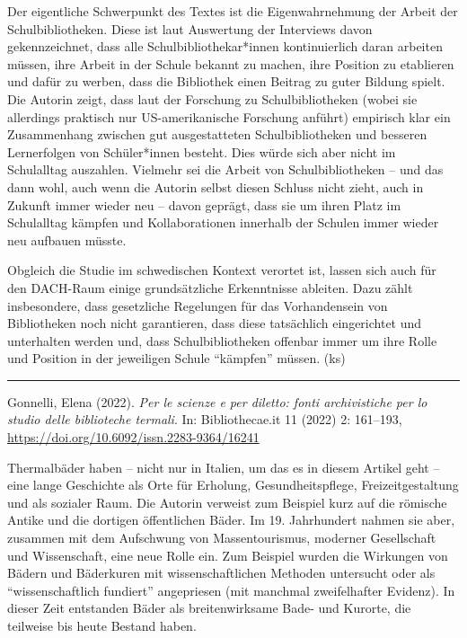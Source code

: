 \documentclass[a4paper,
fontsize=11pt,
oneside,
numbers=noperiodatend,
parskip=half-,
bibliography=totoc,
final
]{scrartcl}
\begin{document}
Der eigentliche Schwerpunkt des Textes ist die Eigenwahrnehmung der
Arbeit der Schulbibliotheken. Diese ist laut Auswertung der Interviews
davon gekennzeichnet, dass alle Schulbibliothekar*innen kontinuierlich
daran arbeiten müssen, ihre Arbeit in der Schule bekannt zu machen, ihre
Position zu etablieren und dafür zu werben, dass die Bibliothek einen
Beitrag zu guter Bildung spielt. Die Autorin zeigt, dass laut der
Forschung zu Schulbibliotheken (wobei sie allerdings praktisch nur
US-amerikanische Forschung anführt) empirisch klar ein Zusammenhang
zwischen gut ausgestatteten Schulbibliotheken und besseren Lernerfolgen
von Schüler*innen besteht. Dies würde sich aber nicht im Schulalltag
auszahlen. Vielmehr sei die Arbeit von Schulbibliotheken -- und das dann
wohl, auch wenn die Autorin selbst diesen Schluss nicht zieht, auch in
Zukunft immer wieder neu -- davon geprägt, dass sie um ihren Platz im
Schulalltag kämpfen und Kollaborationen innerhalb der Schulen immer
wieder neu aufbauen müsste.

Obgleich die Studie im schwedischen Kontext verortet ist, lassen sich
auch für den DACH-Raum einige grundsätzliche Erkenntnisse ableiten. Dazu
zählt insbesondere, dass gesetzliche Regelungen für das Vorhandensein
von Bibliotheken noch nicht garantieren, dass diese tatsächlich
eingerichtet und unterhalten werden und, dass Schulbibliotheken offenbar
immer um ihre Rolle und Position in der jeweiligen Schule
\enquote{kämpfen} müssen. (ks)

\begin{center}\rule{0.5\linewidth}{0.5pt}\end{center}

Gonnelli, Elena (2022). \emph{Per le scienze e per diletto: fonti
archivistiche per lo studio delle biblioteche termali}. In:
Bibliothecae.it 11 (2022) 2: 161--193,
\url{https://doi.org/10.6092/issn.2283-9364/16241}

Thermalbäder haben -- nicht nur in Italien, um das es in diesem Artikel
geht -- eine lange Geschichte als Orte für Erholung, Gesundheitspflege,
Freizeitgestaltung und als sozialer Raum. Die Autorin verweist zum
Beispiel kurz auf die römische Antike und die dortigen öffentlichen
Bäder. Im 19. Jahrhundert nahmen sie aber, zusammen mit dem Aufschwung
von Massentourismus, moderner Gesellschaft und Wissenschaft, eine neue
Rolle ein. Zum Beispiel wurden die Wirkungen von Bädern und Bäderkuren
mit wissenschaftlichen Methoden untersucht oder als
\enquote{wissenschaftlich fundiert} angepriesen (mit manchmal
zweifelhafter Evidenz). In dieser Zeit entstanden Bäder als
breitenwirksame Bade- und Kurorte, die teilweise bis heute Bestand
haben.
\end{document}
